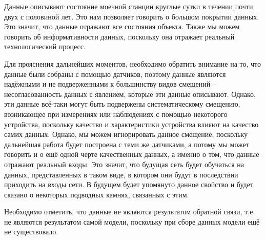 {  \par \redline Данные описывают состояние моечной станции круглые сутки в течении почти двух с половиной лет. Это нам позволяет говорить о большом покрытии данных. Это значит, что данные отражают все состояния объекта. Также мы можем говорить об информативности данных, поскольку она отражает реальный технологический процесс.
  
  \par \redline Для прояснения дальнейших моментов, необходимо обратить внимание на то, что данные были собраны с помощью датчиков, поэтому данные являются надёжными и не подверженными к большинству видов смещений – несогласованность данных с явлением, которые эти данные описывают.  Однако, эти данные всё-таки могут быть подвержены систематическому смещению, возникающее при измерениях или наблюдениях с помощью некоторого устройства, поскольку качество и характеристики устройства влияют на качество самих данных. Однако, мы можем игнорировать данное смещение, поскольку дальнейшая работа будет построена с теми же датчиками, а потому мы может говорить и о ещё одной черте качественных данных, а именно о том, что данные отражают реальный входы. Это значит, что будущая сеть будет обучаться на данных, представленных в таком виде, в котором они будут в последствии приходить на входы сети. В будущем будет упомянуто данное свойство и будет сказано о некоторых подводных камнях, связанных с этим.
  
  \par \redline Необходимо отметить, что данные не являются результатом обратной связи, т.е. не являются результатом самой модели, поскольку при сборе данных модели ещё не существовало.
  
  \par \redline
  
}
